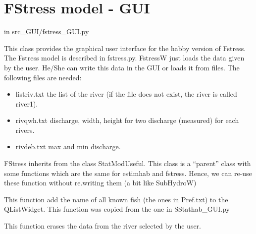 \documentclass[letterpaper,10pt,english]{sphinxmanual}
\begin{document}
\section{FStress model - GUI}
\label{\detokenize{index:fstress-model-gui}}
in src\_GUI/fstress\_GUI.py
\label{\detokenize{index:module-src_GUI.fstress_GUI}}

\begin{fulllineitems}
\label{\detokenize{index:src_GUI.fstress_GUI.FstressW}}
This class provides the graphical user interface for the habby version of Fstress. The Fstress model is described in
fstress.py. FstressW just loads the data given by the user. He/She can write this data in the GUI or loads it
from files. The following files are needed:
\begin{itemize}
\item {} 
listriv.txt the list of the river (if the file does not exist, the river is called river1).

\item {} 
rivqwh.txt discharge, width, height for two discharge (measured) for each rivers.

\item {} 
rivdeb.txt max and min discharge.

\end{itemize}

FStress inherits from the class StatModUseful. This class is a ``parent'' class with some functions which are the same
for estimhab and fstress. Hence, we can re-use these function without re.writing them (a bit like SubHydroW)

\begin{fulllineitems}
\label{\detokenize{index:src_GUI.fstress_GUI.FstressW.add_all_fish}}
This function add the name of all known fish (the ones in Pref.txt) to the QListWidget. This function
was copied from the one in SStathab\_GUI.py

\end{fulllineitems}


\begin{fulllineitems}
\label{\detokenize{index:src_GUI.fstress_GUI.FstressW.erase_name}}
This function erases the data from the river selected by the user.


\end{fulllineitems}
\end{fulllineitems}
\end{document}
